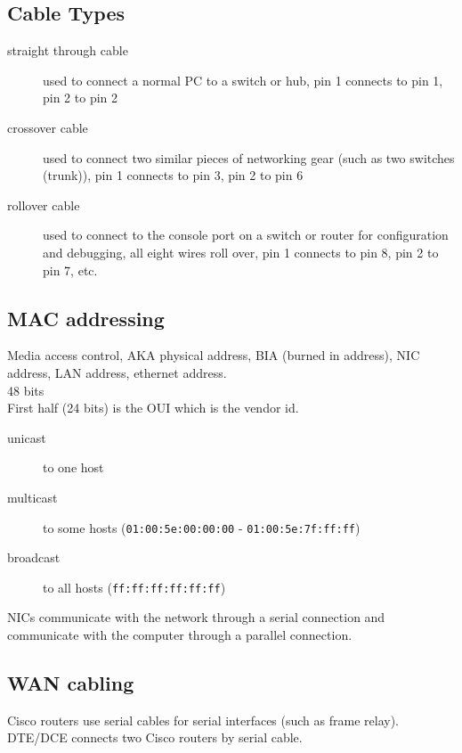 \subsection{Cable Types}

\begin{description}

\item[straight through cable]
used to connect a normal PC to a switch or hub, pin 1 connects to pin 1, pin 2
to pin 2

\item[crossover cable]
used to connect two similar pieces of networking gear (such as two switches
(trunk)), pin 1 connects to pin 3, pin 2 to pin 6

\item[rollover cable]
used to connect to the console port on a switch or router for configuration and
debugging, all eight wires roll over, pin 1 connects to pin 8, pin 2 to pin 7,
etc.

\end{description}

\subsection{MAC addressing}

Media access control, AKA physical address, BIA (burned in address), NIC
address, LAN address, ethernet address.\\

48 bits\\

First half (24 bits) is the OUI which is the vendor id.

\begin {description}

\item[unicast]
to one host

\item[multicast]
to some hosts (\texttt{01:00:5e:00:00:00} - \texttt{01:00:5e:7f:ff:ff})

\item[broadcast]
to all hosts (\texttt{ff:ff:ff:ff:ff:ff})

\end{description}

NICs communicate with the network through a serial connection and communicate
with the computer through a parallel connection.

\subsection{WAN cabling}

Cisco routers use serial cables for serial interfaces (such as frame relay).\\

DTE/DCE connects two Cisco routers by serial cable.


